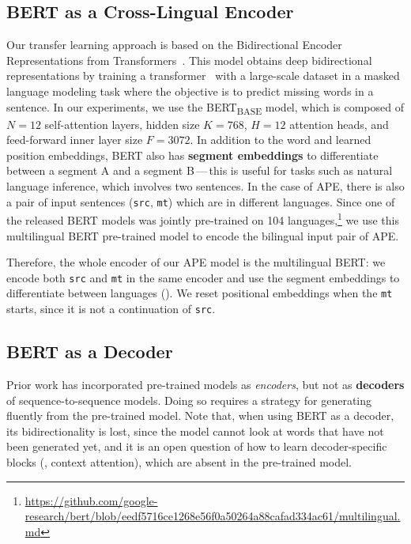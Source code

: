 \subsection{BERT as a Cross-Lingual Encoder}

\noindent Our transfer learning approach is based on the Bidirectional Encoder
Representations from Transformers~\citep[BERT;][]{devlin2018bert}.
This model obtains deep bidirectional representations by training a
transformer~\citep{vaswani2017attention} with a large-scale dataset
in a masked language modeling task where the objective is to predict
missing words in a sentence. In our experiments, we use the BERT\textsubscript{BASE}
model, which is composed of $N\!\!=\!\!12$ self-attention layers, hidden size
$K\!\!=\!768$, $H\!\!=\!\!12$ attention heads, and feed-forward inner layer size
$F\!\!=\!3072$. In addition to the word and learned position embeddings,
BERT also has {\bf segment embeddings} to differentiate between a
segment A and a segment B\,---\,this is useful for tasks such as natural
language inference, which involves two sentences. In the case of APE,
there is also a pair of input sentences ({\tt src}, {\tt mt}) which
are in different languages. Since one of the released BERT models was
jointly pre-trained on 104 languages,\footnote{
    \url{https://github.com/google-research/bert/blob/eedf5716ce1268e56f0a50264a88cafad334ac61/multilingual.md}}
we use this multilingual BERT pre-trained model to encode the
bilingual input pair of APE.

Therefore, the whole encoder of our APE model is the multilingual
BERT: we encode both {\tt src} and {\tt mt} in the same encoder and
use the segment embeddings to differentiate between languages
(). We reset positional
embeddings when the {\tt mt} starts, since it is not a continuation
of {\tt src}.

\subsection{BERT as a Decoder}\label{sec:ape_bert_decoder}

\noindent Prior work has incorporated pre-trained models as {\it encoders}, but
not as {\bf decoders} of sequence-to-sequence models. Doing so
requires a strategy for generating fluently from the pre-trained
model. Note that, when using BERT as a decoder, its bidirectionality is lost, since the
model cannot look at words that have not been generated yet, and it
is an open question of how to learn decoder-specific blocks (\eg,
context attention), which are absent in the pre-trained model.

